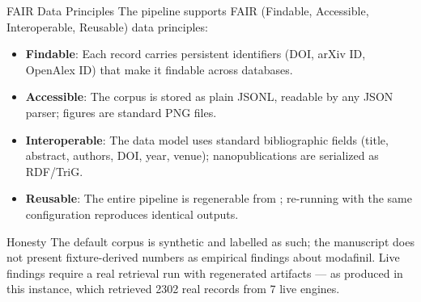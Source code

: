 \documentclass[
  ignorenonframetext,
]{beamer}
\providecommand{\tightlist}{%
  \setlength{\itemsep}{0pt}\setlength{\parskip}{0pt}}
\begin{document}
\begin{frame}{FAIR Data Principles}
\protect{}\label{fair-data-principles}
The pipeline supports FAIR (Findable, Accessible, Interoperable,
Reusable) data principles:

\begin{itemize}
\tightlist
\item
  \textbf{Findable}: Each record carries persistent identifiers (DOI,
  arXiv ID, OpenAlex ID) that make it findable across databases.
\item
  \textbf{Accessible}: The corpus is stored as plain JSONL, readable by
  any JSON parser; figures are standard PNG files.
\item
  \textbf{Interoperable}: The data model uses standard bibliographic
  fields (title, abstract, authors, DOI, year, venue); nanopublications
  are serialized as RDF/TriG.
\item
  \textbf{Reusable}: The entire pipeline is regenerable from
  ; re-running with the same
  configuration reproduces identical outputs.
\end{itemize}
\end{frame}

\begin{frame}[allowframebreaks]{Honesty}
\protect{}\label{honesty}
The default corpus is synthetic and labelled as such; the manuscript
does not present fixture-derived numbers as empirical findings about
modafinil. Live findings require a real retrieval run with regenerated
artifacts --- as produced in this instance, which retrieved 2302 real
records from 7 live engines.
\end{frame}
\end{document}
